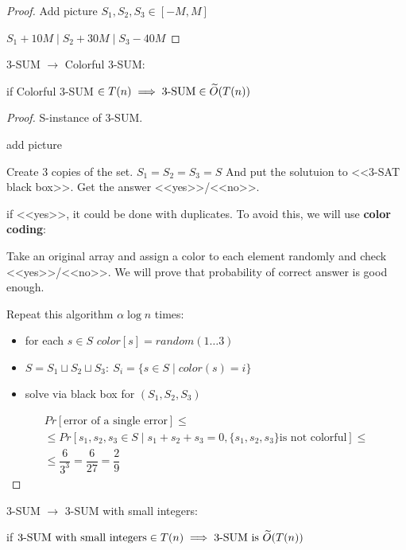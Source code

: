 \begin{proof}
	{\color{red} Add picture}
	$S_1, S_2, S_3 \in [-M, M]$

	$S_1 + 10M \mid S_2 + 30M \mid S_3 - 40M$
\end{proof}

\begin{lm}
	3-SUM $\to$ Colorful 3-SUM:

	if Colorful 3-SUM $\in T(n) \implies \text{3-SUM} \in \widetilde{O}(T(n))$
\end{lm}

\begin{proof}
	S-instance of 3-SUM.

	{\color{red} add picture}

	Create 3 copies of the set. $S_1 = S_2 = S_3 = S$ And put the solutuion to <<3-SAT black box>>. Get the answer <<yes>>/<<no>>.

	if <<yes>>, it could be done with duplicates. To avoid this, we will use \textbf{color coding}:

	Take an original array and assign a color to each element randomly and check <<yes>>/<<no>>.
	We will prove that probability of correct answer is good enough.

	Repeat this algorithm $\alpha \log n$ times:
	\begin{itemize}
		\item for each $s \in S$ $color[s] = random(1 \ldots 3)$
		\item $S = S_1 \sqcup S_2 \sqcup S_3: \ S_i = \{s \in S \mid color(s) = i\}$
		\item solve via black box for $(S_1, S_2, S_3)$
	\end{itemize}
	\begin{align*}
		Pr[\text{error of a single error}] \le \\ \le Pr[s_1, s_2, s_3 \in S \mid s_1 + s_2 + s_3 = 0, \{s_1, s_2, s_3\} \text{is not colorful}] \le \\ \le \dfrac{6}{3^3} = \dfrac{6}{27} = \dfrac{2}{9}
	\end{align*}
\end{proof}

\begin{lm}
	3-SUM $\to$ 3-SUM with small integers:

	if $\text{3-SUM with small integers} \in T(n) \implies \text{3-SUM}\text{ is }\widetilde{O}(T(n))$


\end{lm}

